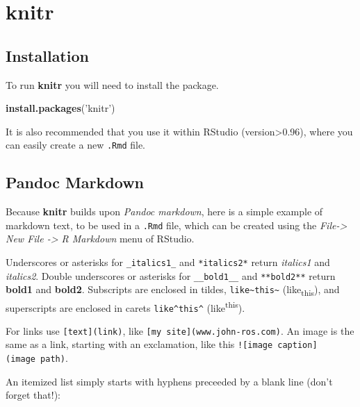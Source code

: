 \documentclass[]{book}
\newenvironment{Shaded}{\begin{snugshade}}{\end{snugshade}}
\newcommand{\KeywordTok}[1]{\textcolor[rgb]{0.13,0.29,0.53}{\textbf{#1}}}
\newcommand{\NormalTok}[1]{#1}
\newcommand{\StringTok}[1]{\textcolor[rgb]{0.31,0.60,0.02}{#1}}
\theoremstyle{definition}
\theoremstyle{definition}
\theoremstyle{definition}
\theoremstyle{remark}
\begin{document}
\hypertarget{knitr}{%
\section{knitr}\label{knitr}}

\hypertarget{installation}{%
\subsection{Installation}\label{installation}}

To run \textbf{knitr} you will need to install the package.

\begin{Shaded}
\begin{Highlighting}[]
\KeywordTok{install.packages}\NormalTok{(}\StringTok{'knitr'}\NormalTok{)}
\end{Highlighting}
\end{Shaded}

It is also recommended that you use it within RStudio (version\textgreater{}0.96), where you can easily create a new \texttt{.Rmd} file.

\hypertarget{pandoc-markdown}{%
\subsection{Pandoc Markdown}\label{pandoc-markdown}}

Because \textbf{knitr} builds upon \emph{Pandoc markdown}, here is a simple example of markdown text, to be used in a \texttt{.Rmd} file, which can be created using the \emph{File-\textgreater{} New File -\textgreater{} R Markdown} menu of RStudio.

Underscores or asterisks for \texttt{\_italics1\_} and \texttt{*italics2*} return \emph{italics1} and \emph{italics2}.
Double underscores or asterisks for \texttt{\_\_bold1\_\_} and \texttt{**bold2**} return \textbf{bold1} and \textbf{bold2}.
Subscripts are enclosed in tildes, \texttt{like\textasciitilde{}this\textasciitilde{}} (like\textsubscript{this}), and superscripts are enclosed in carets \texttt{like\^{}this\^{}} (like\textsuperscript{this}).

For links use \texttt{{[}text{]}(link)}, like \texttt{{[}my\ site{]}(www.john-ros.com)}.
An image is the same as a link, starting with an exclamation, like this \texttt{!{[}image\ caption{]}(image\ path)}.

An itemized list simply starts with hyphens preceeded by a blank line (don't forget that!):
\end{document}
